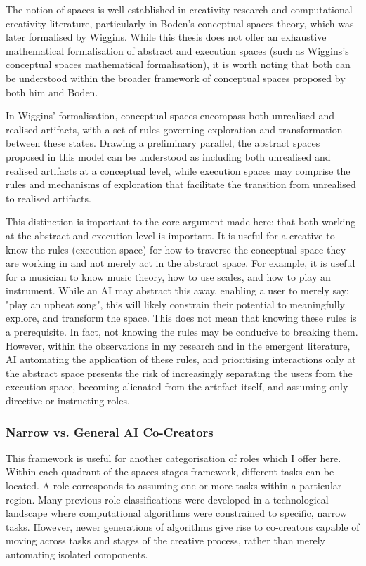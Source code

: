The notion of spaces is well-established in creativity research and computational creativity literature, particularly in Boden's conceptual spaces theory, which was later formalised by Wiggins. While this thesis does not offer an exhaustive mathematical formalisation of abstract and execution spaces (such as Wiggins's conceptual spaces mathematical formalisation), it is worth noting that both can be understood within the broader framework of conceptual spaces proposed by both him and Boden.

In Wiggins' formalisation, conceptual spaces encompass both unrealised and realised artifacts, with a set of rules governing exploration and transformation between these states. Drawing a preliminary parallel, the abstract spaces proposed in this model can be understood as including both unrealised and realised artifacts at a conceptual level, while execution spaces may comprise the rules and mechanisms of exploration that facilitate the transition from unrealised to realised artifacts.

This distinction is important to the core argument made here: that both working at the abstract and execution level is important. It is useful for a creative to know the rules (execution space) for how to traverse the conceptual space they are working in and not merely act in the abstract space. For example, it is useful for a musician to know music theory, how to use scales, and how to play an instrument. While an AI may abstract this away, enabling a user to merely say: "play an upbeat song", this will likely constrain their potential to meaningfully explore, and transform the space. This does not mean that knowing these rules is a prerequisite. In fact, not knowing the rules may be conducive to breaking them. However, within the observations in my research and in the emergent literature, AI automating the application of these rules, and prioritising interactions only at the abstract space presents the risk of increasingly separating the users from the execution space, becoming alienated from the artefact itself, and assuming only directive or instructing roles. 


\subsubsection{Narrow vs. General AI Co-Creators}

This framework is useful for another categorisation of roles which I offer here. Within each quadrant of the spaces-stages framework, different tasks can be located. A role corresponds to assuming one or more tasks within a particular region. Many previous role classifications were developed in a technological landscape where computational algorithms were constrained to specific, narrow tasks. However, newer generations of algorithms give rise to co-creators capable of moving across tasks and stages of the creative process, rather than merely automating isolated components.

